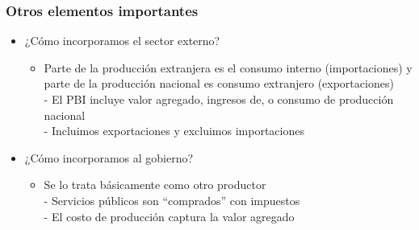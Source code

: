 \documentclass{beamer}
\begin{document}
\begin{frame}
\frametitle{Otros elementos importantes}
\begin{itemize}
        \item ¿Cómo incorporamos el sector externo?
        \begin{itemize}
            \item Parte de la producción extranjera es el consumo interno (importaciones) y parte de la producción nacional es consumo extranjero (exportaciones) \\ 
            - El PBI incluye valor agregado, ingresos de, o consumo de producción nacional \\
            - Incluimos exportaciones y excluimos importaciones
            \end{itemize} \vspace{1mm}
        \item ¿Cómo incorporamos al gobierno?
        \begin{itemize}
            \item Se lo trata básicamente como otro productor \\
            - Servicios públicos son “comprados” con impuestos \\
            - El costo de producción captura la valor agregado
            \end{itemize}
\end{itemize}
\end{frame}
\end{document}
